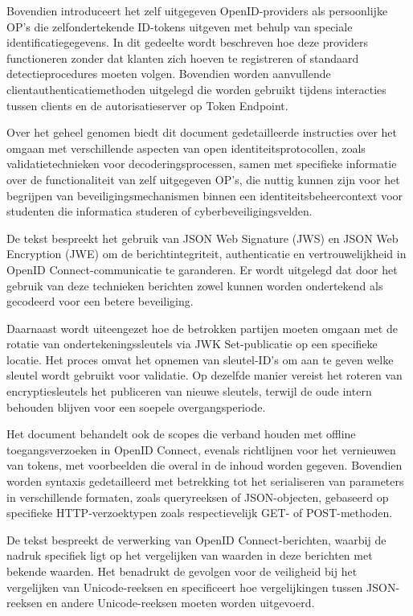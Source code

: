 Bovendien introduceert het zelf uitgegeven OpenID-providers als persoonlijke OP's die zelfondertekende ID-tokens uitgeven met behulp van speciale identificatiegegevens. In dit gedeelte wordt beschreven hoe deze providers functioneren zonder dat klanten zich hoeven te registreren of standaard detectieprocedures moeten volgen.
Bovendien worden aanvullende clientauthenticatiemethoden uitgelegd die worden gebruikt tijdens interacties tussen clients en de autorisatieserver op Token Endpoint.

Over het geheel genomen biedt dit document gedetailleerde instructies over het omgaan met verschillende aspecten van open identiteitsprotocollen, zoals validatietechnieken voor decoderingsprocessen, samen met specifieke informatie over de functionaliteit van zelf uitgegeven OP's, die nuttig kunnen zijn voor het begrijpen van beveiligingsmechanismen binnen een identiteitsbeheercontext voor studenten die informatica studeren of cyberbeveiligingsvelden.

De tekst bespreekt het gebruik van JSON Web Signature (JWS) en JSON Web Encryption (JWE) om de berichtintegriteit, authenticatie en vertrouwelijkheid in OpenID Connect-communicatie te garanderen. Er wordt uitgelegd dat door het gebruik van deze technieken berichten zowel kunnen worden ondertekend als gecodeerd voor een betere beveiliging.

Daarnaast wordt uiteengezet hoe de betrokken partijen moeten omgaan met de rotatie van ondertekeningssleutels via JWK Set-publicatie op een specifieke locatie. Het proces omvat het opnemen van sleutel-ID's om aan te geven welke sleutel wordt gebruikt voor validatie. Op dezelfde manier vereist het roteren van encryptiesleutels het publiceren van nieuwe sleutels, terwijl de oude intern behouden blijven voor een soepele overgangsperiode.

Het document behandelt ook de scopes die verband houden met offline toegangsverzoeken in OpenID Connect, evenals richtlijnen voor het vernieuwen van tokens, met voorbeelden die overal in de inhoud worden gegeven.
Bovendien worden syntaxis gedetailleerd met betrekking tot het serialiseren van parameters in verschillende formaten, zoals queryreeksen of JSON-objecten, gebaseerd op specifieke HTTP-verzoektypen zoals respectievelijk GET- of POST-methoden.

De tekst bespreekt de verwerking van OpenID Connect-berichten, waarbij de nadruk specifiek ligt op het vergelijken van waarden in deze berichten met bekende waarden. Het benadrukt de gevolgen voor de veiligheid bij het vergelijken van Unicode-reeksen en specificeert hoe vergelijkingen tussen JSON-reeksen en andere Unicode-reeksen moeten worden uitgevoerd.

